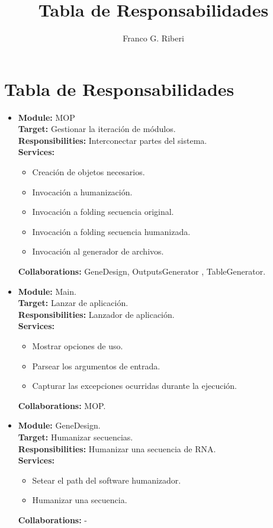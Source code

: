 \documentclass[12pt,a4paper]{article}
\title{Tabla de Responsabilidades}
\author{Franco G. Riberi}
\begin{document}

\section*{Tabla de Responsabilidades}

\begin{itemize}
    \item \textbf{Module:} MOP \\
    \textbf{Target:} Gestionar la iteración de módulos. \\
    \textbf{Responsibilities:} Interconectar partes del sistema. \\
    \textbf{Services:} 
        \begin{itemize}
            \item Creación de objetos necesarios.
            \item Invocación a humanización.
            \item Invocación a folding secuencia original.
            \item Invocación a folding secuencia humanizada.
            \item Invocación al generador de archivos.
        \end{itemize}
    \textbf{Collaborations:}	GeneDesign, OutputsGenerator , TableGenerator. \\

    \item \textbf{Module:} Main. \\
    \textbf{Target:} Lanzar de aplicación. \\
    \textbf{Responsibilities:} Lanzador de aplicación. \\
    \textbf{Services:}
        \begin{itemize}
            \item Mostrar opciones de uso.
            \item Parsear los argumentos de entrada.
            \item Capturar las excepciones ocurridas durante la ejecución.
        \end{itemize} 
    \textbf{Collaborations:}	MOP. \\

    \item \textbf{Module:} GeneDesign. \\
    \textbf{Target:}  Humanizar secuencias. \\
    \textbf{Responsibilities:} Humanizar una secuencia de RNA. \\
    \textbf{Services:}
        \begin{itemize}
            \item Setear el path del software humanizador.
            \item Humanizar una secuencia.
        \end{itemize} 
    \textbf{Collaborations:}	- \\


\end{itemize}
\end{document}
